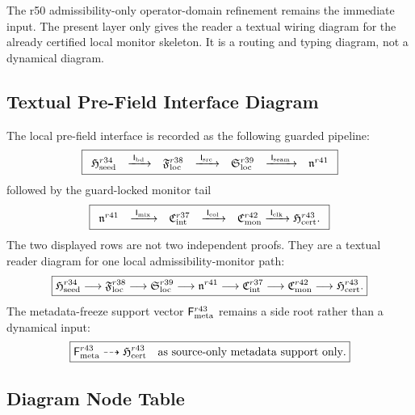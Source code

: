 The r50 admissibility-only operator-domain refinement remains the immediate
input.  The present layer only gives the reader a textual wiring diagram for the
already certified local monitor skeleton.  It is a routing and typing diagram,
not a dynamical diagram.

\subsection{Textual Pre-Field Interface Diagram}
\label{subsec:r51-textual-diagram}

The local pre-field interface is recorded as the following guarded pipeline:
\[
\boxed{
\begin{array}{ccccccc}
\mathfrak H_{\rm seed}^{r34}
&\xrightarrow{\;\mathsf I_{\rm bd}\;}&
\mathfrak F_{\rm loc}^{r38}
&\xrightarrow{\;\mathsf I_{\rm src}\;}&
\mathfrak S_{\rm loc}^{r39}
&\xrightarrow{\;\mathsf I_{\rm seam}\;}&
\mathfrak n^{r41}
\end{array}}
\]
followed by the guard-locked monitor tail
\[
\boxed{
\begin{array}{ccccc}
\mathfrak n^{r41}
&\xrightarrow{\;\mathsf I_{\rm mix}\;}&
\mathfrak C_{\rm int}^{r37}
&\xrightarrow{\;\mathsf I_{\rm col}\;}&
\mathfrak C_{\rm mon}^{r42}
\xrightarrow{\;\mathsf I_{\rm clk}\;}
\mathfrak H_{\rm cert}^{r43}.
\end{array}}
\]
The two displayed rows are not two independent proofs.  They are a textual
reader diagram for one local admissibility-monitor path:
\[
\boxed{
\mathfrak H_{\rm seed}^{r34}
\longrightarrow
\mathfrak F_{\rm loc}^{r38}
\longrightarrow
\mathfrak S_{\rm loc}^{r39}
\longrightarrow
\mathfrak n^{r41}
\longrightarrow
\mathfrak C_{\rm int}^{r37}
\longrightarrow
\mathfrak C_{\rm mon}^{r42}
\longrightarrow
\mathfrak H_{\rm cert}^{r43}.
}
\]
The metadata-freeze support vector \(\mathsf F_{\rm meta}^{r43}\) remains a side
root rather than a dynamical input:
\[
\boxed{
\mathsf F_{\rm meta}^{r43}
\dashrightarrow
\mathfrak H_{\rm cert}^{r43}
\quad\text{as source-only metadata support only}.}
\]

\subsection{Diagram Node Table}
\label{subsec:r51-node-table}

